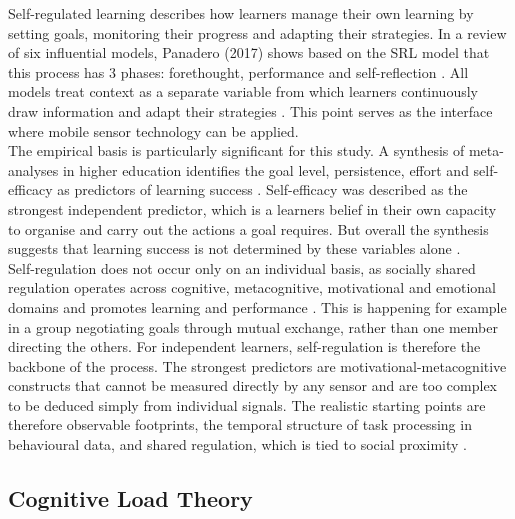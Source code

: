 \documentclass[runningheads]{llncs}
\begin{document}
Self-regulated learning describes how learners manage their own learning by setting goals, monitoring their progress and adapting their strategies. In a review of six influential models, Panadero (2017) shows based on the SRL model that this process has 3 phases: forethought, performance and self-reflection \cite{panadero_review_2017}. All models treat context as a separate variable from which learners continuously draw information and adapt their strategies \cite{panadero_review_2017}. This point serves as the interface where mobile sensor technology can be applied.\\
The empirical basis is particularly significant for this study. A synthesis of meta-analyses in higher education identifies the goal level, persistence, effort and self-efficacy as predictors of learning success \cite{panadero_review_2017}. Self-efficacy was described as the strongest independent predictor, which is a learners belief in their own capacity to organise and carry out the actions a goal requires. But overall the synthesis suggests that learning success is not determined by these variables alone \cite{panadero_review_2017}. \\
Self-regulation does not occur only on an individual basis, as socially shared regulation operates across cognitive, metacognitive, motivational and emotional domains and promotes learning and performance \cite{panadero_review_2017}.
This is happening for example in a group negotiating goals through mutual exchange, rather than one member directing the others. %
For independent learners, self-regulation is therefore the backbone of the process. The strongest predictors are motivational-metacognitive constructs that cannot be measured directly by any sensor and are too complex to be deduced simply from individual signals.
The realistic starting points are therefore observable footprints, the temporal structure of task processing in behavioural data, and shared regulation, which is tied to social proximity \cite{panadero_review_2017}.

\subsection{Cognitive Load Theory}
\end{document}
